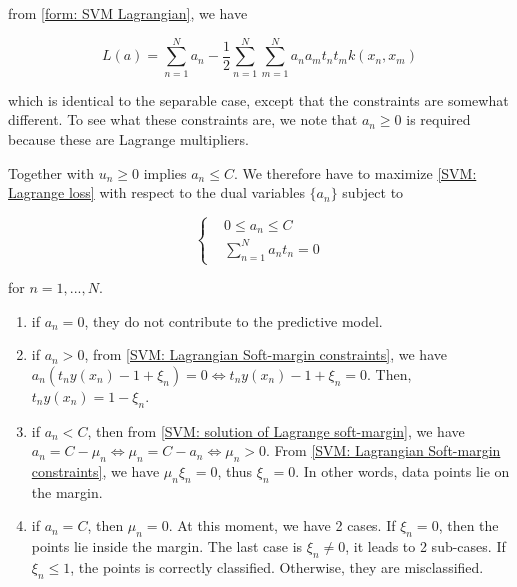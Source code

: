 from \ref{form: SVM Lagrangian}, we have

\begin{equation}
    \label{SVM: Lagrange loss}
    L(a) = \sum_{n=1}^N a_n - \frac{1}{2}\sum_{n=1}^N\sum_{m=1}^N a_n a_m t_n t_m k(x_n, x_m)  
\end{equation}


which is identical to the separable case, except that the constraints are somewhat different. To see what these constraints are, we note that $a_n \geq 0$ is required because these are Lagrange multipliers.

Together with $u_n \geq 0$ implies $a_n \leq C$. We therefore have to maximize \ref{SVM:  Lagrange loss} with respect to the dual variables $\{a_n\}$ subject to

\begin{equation}
  \left\{
    \begin{aligned}
      & 0 \leq a_n \leq C\\
      & \sum_{n=1}^N a_n t_n = 0
    \end{aligned}
  \right.
\end{equation}

for $n=1, ..., N$.

\begin{enumerate}
    \item if $a_n = 0$, they do not contribute to the predictive model.
    \item if $a_n > 0$, from \ref{SVM: Lagrangian Soft-margin constraints}, we have $a_n(t_ny(x_n) -1 + \xi_n) = 0 \Leftrightarrow t_ny(x_n) -1 + \xi_n = 0$. Then, $t_ny(x_n) = 1 - \xi_n$.
    \item if $a_n < C$, then from \ref{SVM: solution of Lagrange soft-margin}, we have $a_n = C - \mu_n \Leftrightarrow \mu_n = C - a_n \Leftrightarrow \mu_n > 0$. From \ref{SVM: Lagrangian Soft-margin constraints}, we have $\mu_n \xi_n = 0$, thus $\xi_n = 0$. In other words, data points lie on the margin.
    \item if $a_n = C$, then $\mu_n = 0$. At this moment, we have 2 cases. If $\xi_n = 0$, then the points lie inside the margin. The last case is $\xi_n \neq 0$, it leads to 2 sub-cases. If $\xi_n \leq 1$, the points is correctly classified. Otherwise, they are misclassified.
\end{enumerate}


